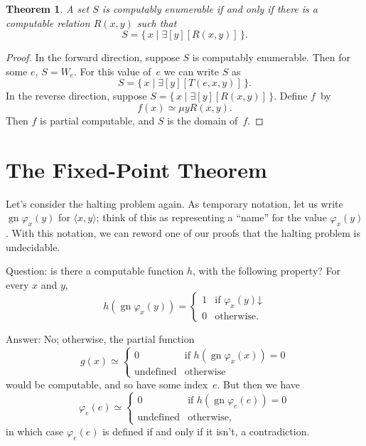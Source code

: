 \documentclass[10pt,a4paper]{article}
\theoremstyle{plain}
\newtheorem{thm}{Theorem}[section]
\theoremstyle{definition}
\theoremstyle{remark}
\newcommand*{\olfileid}[3]{}
\newcommand*{\olsection}[1]{\section*{#1}}
\newcommand*{\ollabel}[1]{\label{#1}}
\providecommand{\lexists}{\mathord{\exists}}
\providecommand{\tuple}[1]{\langle #1 \rangle}
\providecommand{\cfind}[1]{\varphi_{#1}}
\providecommand{\fdefined}{\mathord{\downarrow}}
\providecommand{\Setabs}[2]{\{\, #1 \mid #2 \,\}}
\providecommand{\gn}{\operatorname{gn}}
\providecommand{\umin}{\mu}
\begin{document}
\begin{thm}
\ollabel{thm:exists-char}
A set $S$ is computably enumerable if and only if there is a
computable relation $R(x,y)$ such that
\[
S = \Setabs{ x }{ \lexists[y][R(x,y)] }.
\]
\end{thm}

\begin{proof}
In the forward direction, suppose $S$ is computably
enumerable. Then for some $e$, $S = W_e$. For this value of~$e$
we can write $S$ as
\[
S = \Setabs{ x }{ \lexists[y][T(e, x, y)] }.
\]
In the reverse direction, suppose $S = \Setabs{ x }{
  \lexists[y][R(x, y)] }$. Define $f$~by
\[
f(x) \simeq \umin{y}{R(x, y)}.
\]
Then $f$ is partial computable, and $S$ is the domain of~$f$.
\end{proof}






\olfileid{cmp}{thy}{fix}
\olsection{The Fixed-Point Theorem}

Let's consider the halting problem again. As temporary
notation, let us write $\gn{\cfind{x}(y)}$ for $\tuple{x, y}$; think of
this as representing a ``name'' for the value $\cfind{x}(y)$. With this
notation, we can reword one of our proofs that the halting problem is
undecidable.

Question: is there a computable function $h$, with the
following property? For every $x$ and $y$,
\[
h(\gn{\cfind{x}(y)}) =
\begin{cases}
1 & \text{if $\cfind{x}(y) \fdefined$} \\
0 & \text{otherwise.}
\end{cases}
\]

Answer: No; otherwise, the partial function
\[
g(x) \simeq
\begin{cases}
0 & \text{if $h(\gn{\cfind{x}(x)}) = 0$} \\
\text{undefined} & \text{otherwise}
\end{cases}
\]
would be computable, and so have some index~$e$. But then we have
\[
\cfind{e}(e) \simeq
\begin{cases}
0 & \text{if $h(\gn{\cfind{e}(e)}) = 0$} \\
\text{undefined} & \text{otherwise,}
\end{cases}
\]
in which case $\cfind{e}(e)$ is defined if and only if it isn't, a
contradiction.
\end{document}
